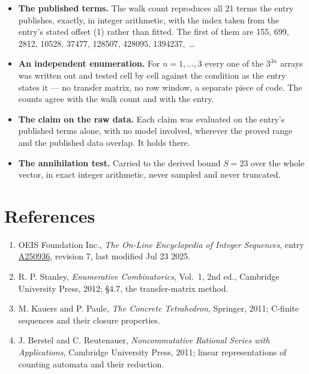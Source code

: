 \documentclass[11pt]{article}
\theoremstyle{definition}
\begin{document}
\begin{itemize}

\item {\bfseries The published terms.} The walk count reproduces all 21 terms the entry publishes, exactly, in integer arithmetic, with the index taken from the entry's stated offset (1) rather than fitted. The first of them are 155, 699, 2812, 10528, 37477, 128507, 428095, 1394237,~\dots

\item {\bfseries An independent enumeration.} For $n = 1,\dots,3$ every one of the $3^{3n}$ arrays was written out and tested cell by cell against the condition as the entry states it --- no transfer matrix, no row window, a separate piece of code. The counts agree with the walk count and with the entry.

\item {\bfseries The claim on the raw data.} Each claim was evaluated on the entry's published terms alone, with no model involved, wherever the proved range and the published data overlap. It holds there.

\item {\bfseries The annihilation test.} Carried to the derived bound $S = 23$ over the whole vector, in exact integer arithmetic, never sampled and never truncated.

\end{itemize}

\section{References}

\begin{enumerate}

\item OEIS Foundation Inc., \emph{The On-Line Encyclopedia of Integer Sequences}, entry \href{https://oeis.org/A250936}{A250936}, revision 7, last modified Jul 23 2025.

\item R. P. Stanley, \emph{Enumerative Combinatorics}, Vol.~1, 2nd ed., Cambridge University Press, 2012; \S4.7, the transfer-matrix method.

\item M. Kauers and P. Paule, \emph{The Concrete Tetrahedron}, Springer, 2011; C-finite sequences and their closure properties.

\item J. Berstel and C. Reutenauer, \emph{Noncommutative Rational Series with Applications}, Cambridge University Press, 2011; linear representations of counting automata and their reduction.

\end{enumerate}
\end{document}
